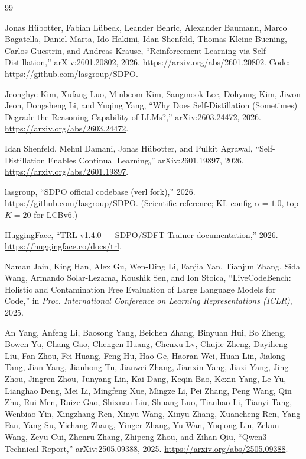 \renewcommand{\bibname}{References}
\begin{thebibliography}{99}

 Jonas Hübotter, Fabian Lübeck, Leander Behric, Alexander Baumann, Marco Bagatella, Daniel Marta, Ido Hakimi, Idan Shenfeld, Thomas Kleine Buening, Carlos Guestrin, and Andreas Krause, ``Reinforcement Learning via Self-Distillation,'' arXiv:2601.20802, 2026. \url{https://arxiv.org/abs/2601.20802}. Code: \url{https://github.com/lasgroup/SDPO}.

 Jeonghye Kim, Xufang Luo, Minbeom Kim, Sangmook Lee, Dohyung Kim, Jiwon Jeon, Dongsheng Li, and Yuqing Yang, ``Why Does Self-Distillation (Sometimes) Degrade the Reasoning Capability of LLMs?,'' arXiv:2603.24472, 2026. \url{https://arxiv.org/abs/2603.24472}.

 Idan Shenfeld, Mehul Damani, Jonas Hübotter, and Pulkit Agrawal, ``Self-Distillation Enables Continual Learning,'' arXiv:2601.19897, 2026. \url{https://arxiv.org/abs/2601.19897}.

 lasgroup, ``SDPO official codebase (verl fork),'' 2026. \url{https://github.com/lasgroup/SDPO}. (Scientific reference; KL config $\alpha=1.0$, top-$K=20$ for LCBv6.)

 HuggingFace, ``TRL v1.4.0 --- SDPO/SDFT Trainer documentation,'' 2026. \url{https://huggingface.co/docs/trl}.

 Naman Jain, King Han, Alex Gu, Wen-Ding Li, Fanjia Yan, Tianjun Zhang, Sida Wang, Armando Solar-Lezama, Koushik Sen, and Ion Stoica, ``LiveCodeBench: Holistic and Contamination Free Evaluation of Large Language Models for Code,'' in \emph{Proc. International Conference on Learning Representations (ICLR)}, 2025.

 An Yang, Anfeng Li, Baosong Yang, Beichen Zhang, Binyuan Hui, Bo Zheng, Bowen Yu, Chang Gao, Chengen Huang, Chenxu Lv, Chujie Zheng, Dayiheng Liu, Fan Zhou, Fei Huang, Feng Hu, Hao Ge, Haoran Wei, Huan Lin, Jialong Tang, Jian Yang, Jianhong Tu, Jianwei Zhang, Jianxin Yang, Jiaxi Yang, Jing Zhou, Jingren Zhou, Junyang Lin, Kai Dang, Keqin Bao, Kexin Yang, Le Yu, Lianghao Deng, Mei Li, Mingfeng Xue, Mingze Li, Pei Zhang, Peng Wang, Qin Zhu, Rui Men, Ruize Gao, Shixuan Liu, Shuang Luo, Tianhao Li, Tianyi Tang, Wenbiao Yin, Xingzhang Ren, Xinyu Wang, Xinyu Zhang, Xuancheng Ren, Yang Fan, Yang Su, Yichang Zhang, Yinger Zhang, Yu Wan, Yuqiong Liu, Zekun Wang, Zeyu Cui, Zhenru Zhang, Zhipeng Zhou, and Zihan Qiu, ``Qwen3 Technical Report,'' arXiv:2505.09388, 2025. \url{https://arxiv.org/abs/2505.09388}.


\end{thebibliography}
